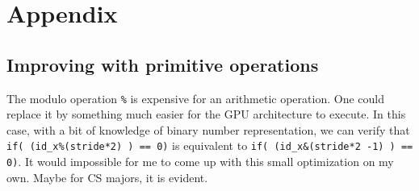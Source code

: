 \documentclass[12pt]{article}
\begin{document}
\section{Appendix}
\subsection*{Improving with primitive operations}\label{App.:Primitive operations}
The modulo operation \verb|%| is expensive for an arithmetic operation. One could replace it 
by something much easier for the GPU architecture to execute. In this case, with a bit of 
knowledge of binary number representation, we can verify that \verb|if( (id_x%(stride*2) ) == 0)| is 
equivalent to \verb|if( (id_x&(stride*2 -1) ) == 0)|. It would impossible for me to come up with this small 
optimization on my own. Maybe for CS majors, it is evident.

%
%
%
%



%
\end{document}
